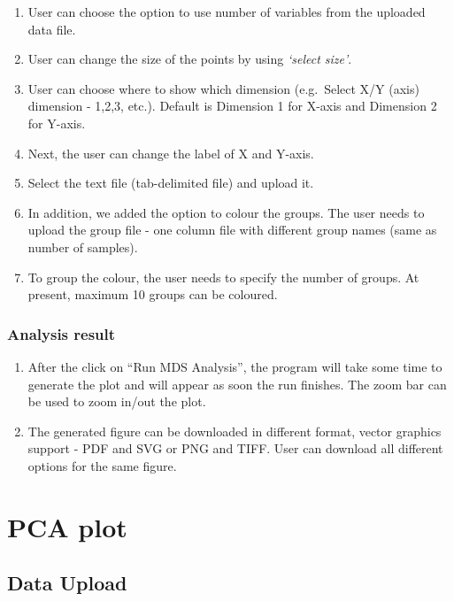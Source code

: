 \documentclass[
  a4paper,
  DIV=11,
  numbers=noendperiod,
  oneside,
  open=any]{scrreport}
\providecommand{\tightlist}{%
  \setlength{\itemsep}{0pt}\setlength{\parskip}{0pt}}\usepackage{longtable,booktabs,array}
\begin{document}
\begin{enumerate}
\def\labelenumi{\arabic{enumi}.}
\tightlist
\item
  User can choose the option to use number of variables from the
  uploaded data file.
\item
  User can change the size of the points by using \emph{`select size'}.
\item
  User can choose where to show which dimension (e.g.~Select X/Y (axis)
  dimension - 1,2,3, etc.). Default is Dimension 1 for X-axis and
  Dimension 2 for Y-axis.
\item
  Next, the user can change the label of X and Y-axis.
\item
  Select the text file (tab-delimited file) and upload it.
\item
  In addition, we added the option to colour the groups. The user needs
  to upload the group file - one column file with different group names
  (same as number of samples).
\item
  To group the colour, the user needs to specify the number of groups.
  At present, maximum 10 groups can be coloured.
\end{enumerate}

\subsubsection{Analysis result}\label{analysis-result}

\begin{enumerate}
\def\labelenumi{\arabic{enumi}.}
\tightlist
\item
  After the click on ``Run MDS Analysis'', the program will take some
  time to generate the plot and will appear as soon the run finishes.
  The zoom bar can be used to zoom in/out the plot.
\item
  The generated figure can be downloaded in different format, vector
  graphics support - PDF and SVG or PNG and TIFF. User can download all
  different options for the same figure.\\
\end{enumerate}

\section{PCA plot}\label{pca-plot}

\subsection{Data Upload}\label{data-upload-2}
\end{document}
